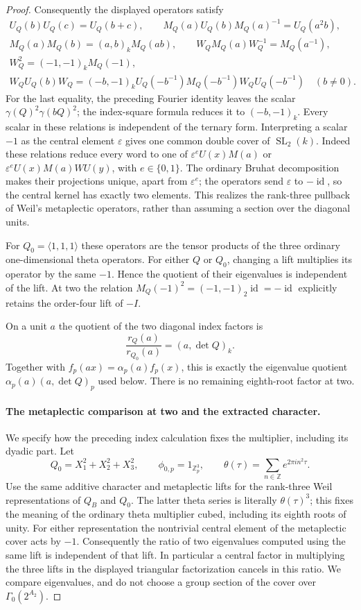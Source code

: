 \documentclass[11pt]{article}
\theoremstyle{definition}
\theoremstyle{remark}
\begin{document}
\begin{proof}
Consequently the displayed operators satisfy
\[
 \begin{gathered}
 U_Q(b)U_Q(c)=U_Q(b+c),\qquad
 M_Q(a)U_Q(b)M_Q(a)^{-1}=U_Q(a^2b),\\
 M_Q(a)M_Q(b)=(a,b)_kM_Q(ab),\qquad
 W_QM_Q(a)W_Q^{-1}=M_Q(a^{-1}),\\
 W_Q^2=(-1,-1)_kM_Q(-1),\\
 W_QU_Q(b)W_Q
 =(-b,-1)_kU_Q(-b^{-1})M_Q(-b^{-1})W_QU_Q(-b^{-1})
 \quad(b\ne0).
 \end{gathered}
\]
For the last equality, the preceding Fourier identity leaves
the scalar $\gamma(Q)^2\gamma(bQ)^2$; the index-square formula
reduces it to $(-b,-1)_k$. Every scalar in these relations is
independent of the ternary form. Interpreting a scalar $-1$ as
the central element $\varepsilon$ gives one common double
cover of $\operatorname{SL}_2(k)$. Indeed these relations reduce
every word to one of
$\varepsilon^eU(x)M(a)$ or
$\varepsilon^eU(x)M(a)WU(y)$, with $e\in\{0,1\}$.
The ordinary Bruhat decomposition makes their projections
unique, apart from $\varepsilon^e$; the operators send
$\varepsilon$ to $-\operatorname{id}$, so the central kernel
has exactly two elements. This realizes the rank-three pullback
of Weil's metaplectic operators, rather than assuming a section
over the diagonal units.

For $Q_0=\langle1,1,1\rangle$ these operators are the tensor
products of the three ordinary one-dimensional theta operators.
For either $Q$ or $Q_0$, changing a lift multiplies its operator
by the same $-1$. Hence the quotient of their eigenvalues is
independent of the lift. At two the relation
$M_Q(-1)^2=(-1,-1)_2\operatorname{id}=-\operatorname{id}$
explicitly retains the order-four lift of $-I$.

On a unit $a$ the quotient of the two diagonal index factors is
\[
 \frac{r_Q(a)}{r_{Q_0}(a)}=(a,\det Q)_k.
\]
Together with $f_p(ax)=\alpha_p(a)f_p(x)$, this is exactly
the eigenvalue quotient $\alpha_p(a)(a,\det Q)_p$ used below.
There is no remaining eighth-root factor at two.

\paragraph{The metaplectic comparison at two and the extracted character.}
We specify how the preceding index calculation fixes the multiplier,
including its dyadic part. Let
\[
 Q_0=X_1^2+X_2^2+X_3^2,\qquad
 \phi_{0,p}=1_{\mathbb Z_p^3},\qquad
 \theta(\tau)=\sum_{n\in\mathbb Z}e^{2\pi i n^2\tau}.
\]
Use the same additive character and metaplectic lifts for the
rank-three Weil representations of $Q_B$ and $Q_0$. The latter
theta series is literally $\theta(\tau)^3$; this fixes the meaning
of the ordinary theta multiplier cubed, including its eighth roots
of unity. For either representation the nontrivial central element
of the metaplectic cover acts by $-1$. Consequently the ratio of
two eigenvalues computed using the same lift is independent of
that lift. In particular a central factor in multiplying the
three lifts in the displayed triangular factorization cancels
in this ratio. We compare eigenvalues, and do not choose a group
section of the cover over $\Gamma_0(2^{A_2})$.


\end{proof}
\end{document}
